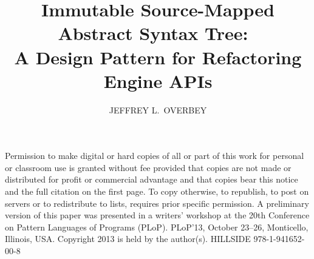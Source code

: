 \documentclass[prodmode]{acmlarge}
\title{Immutable Source-Mapped Abstract Syntax Tree:\ \\
A Design Pattern for Refactoring Engine APIs} %
\author{JEFFREY L.\ OVERBEY \affil{Auburn University}}
\begin{document}
\begin{bottomstuff}
Permission to make digital or hard copies of all or part of this work for
personal or classroom use is granted without fee provided that copies are not
made or distributed for profit or commercial advantage and that copies bear
this notice and the full citation on the first page. To copy otherwise, to
republish, to post on servers or to redistribute to lists, requires prior
specific permission. A preliminary version of this paper was presented in a
writers' workshop at the 20th Conference on Pattern Languages of Programs
(PLoP).  PLoP'13, October 23--26, Monticello, Illinois, USA. Copyright 2013 is
held by the author(s). HILLSIDE 978-1-941652-00-8
\end{bottomstuff}


\maketitle
\end{document}
